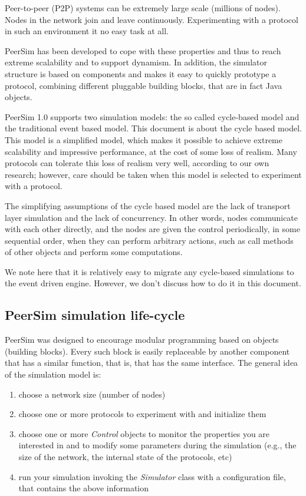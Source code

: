 \documentclass[a4paper,11pt]{article}
\begin{document}
Peer-to-peer (P2P) systems can be extremely large
scale (millions of nodes).
Nodes in the network join and leave continuously.
Experimenting with a protocol in such an environment it no easy task at all.

PeerSim has been developed to cope with these properties and thus
to reach extreme scalability and to support dynamism. In addition,
the simulator structure is based on components and makes it easy to quickly
prototype a protocol, combining different pluggable building
blocks, that are in fact Java objects.

PeerSim 1.0 supports two simulation models: the so called cycle-based model
and the traditional event based model.
This document is about the cycle based model.
This model is a simplified model, which makes it possible to achieve extreme
scalability and impressive performance, at the cost of some loss of realism.
Many protocols can tolerate this loss of realism very well, according to
our own research; however,
care should be taken when this model is selected to experiment with a protocol.

The simplifying assumptions of the cycle based model are the lack of
transport layer simulation and the lack of concurrency.
In other words, nodes communicate with each other directly, and the nodes
are given the control periodically, in some sequential order, when they can
perform arbitrary actions, such as call methods of other objects and perform
some computations.

We note here that it is relatively easy to migrate any cycle-based simulations
to the event driven engine. However, we don't discuss how to do it in this
document.

\subsection{PeerSim simulation life-cycle}

PeerSim was designed to encourage modular programming based on objects
(building blocks). Every such block is easily replaceable by another component
that has a similar function, that is, that  has the same interface.
The general idea of the simulation model is:

\begin{enumerate}
\item choose a network size (number of nodes) 
\item choose one or more protocols to experiment with and initialize
them
\item choose one or more \emph{Control} objects
  to monitor the properties
  you are interested in and to modify some parameters during
  the simulation (e.g., the size of the
 network, the internal state of the protocols, etc) 
\item run your simulation invoking the \emph{Simulator} class with a
configuration file, that contains the above information
\end{enumerate}
\end{document}
